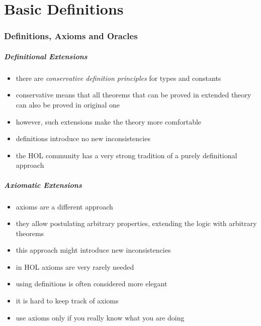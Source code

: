 \part{Basic Definitions}

\frame[plain]{\partpage}

\section{Definitions, Axioms and Oracles}

\begin{frame}
\frametitle{Definitional Extensions}
\begin{itemize}
\item there are \emph{conservative definition principles} for types and constants
\item conservative means that all theorems that can be proved in extended theory can also be proved in original one
\item however, such extensions make the theory more comfortable
\item definitions introduce \alert{no new inconsistencies}
\item the HOL community has a very strong tradition of a purely definitional approach
\end{itemize}
\end{frame}

\begin{frame}
\frametitle{Axiomatic Extensions}
\begin{itemize}
\item \alert{axioms} are a different approach
\item they allow postulating arbitrary properties, \ie extending the logic with arbitrary theorems 
\item this approach might introduce new inconsistencies
\item in HOL axioms are very rarely needed
\item using definitions is often considered more elegant
\item it is hard to keep track of axioms
\item use axioms only if you really know what you are doing
\end{itemize}
\end{frame}

